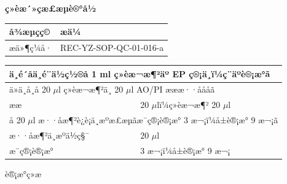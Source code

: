 \documentclass[UTF8,10pt,a4paper,fontset=fandol]{ctexart}
\newcommand{\fieldvalue}[1]{#1}
\newcommand{\handwritten}[1]{#1}
\begin{document}
\begin{center}
\begin{center}
\newpage

\begin{center}
\textbf{ç»èæ´»çæ£æµè®°å½}
\end{center}

\noindent
\begin{tabularx}{\textwidth}{|p{}|X|}
\hline
å¾æµçç© &
\fieldvalue{\handwritten{æä¼}} \\
\hline
æä»¶ç¼å· & REC-YZ-SOP-QC-01-016-a \\
\hline
\end{tabularx}

\medskip

\begin{tabularx}{\textwidth}{|p{}|X|}
\hline
\multicolumn{2}{|l|}{ä¸­é´åä¸é¨ä½ç½®å 1 ml ç»èæ¬æ¶²äº EP ç®¡ä¸­ï¼ç¨äºè®¡æ°ã} \\
\hline
\multicolumn{2}{|l|}{ä»ä¸­å¸å 20 $\mu$l ç»èæ¬æ¶²ä¸ 20 $\mu$l AO/PI æææ··åååã} \\
\hline
ææ &
\fieldvalue{\handwritten{20}} $\mu$lï¼ç»èæ¬æ¶²
\fieldvalue{\handwritten{20}} $\mu$l \\
\hline
\multicolumn{2}{|l|}{å 20 $\mu$l æ··åæ¶²è¿è¡ä¸æºæ£æµãæ¯ç®¡è®¡æ° 3 æ¬¡ï¼å±è®¡æ° 9 æ¬¡ã} \\
\hline
æ··åæ¶²ä¸æºä½ç§¯ &
\fieldvalue{\handwritten{20}} $\mu$l \\
\hline
æ¯ç®¡è®¡æ° &
\fieldvalue{\handwritten{3}} æ¬¡ï¼å±è®¡æ°
\fieldvalue{\handwritten{9}} æ¬¡ \\
\hline
\end{tabularx}

\begin{center}
è®¡æ°ç»æ
\end{center}


\end{center}
\end{center}
\end{document}
